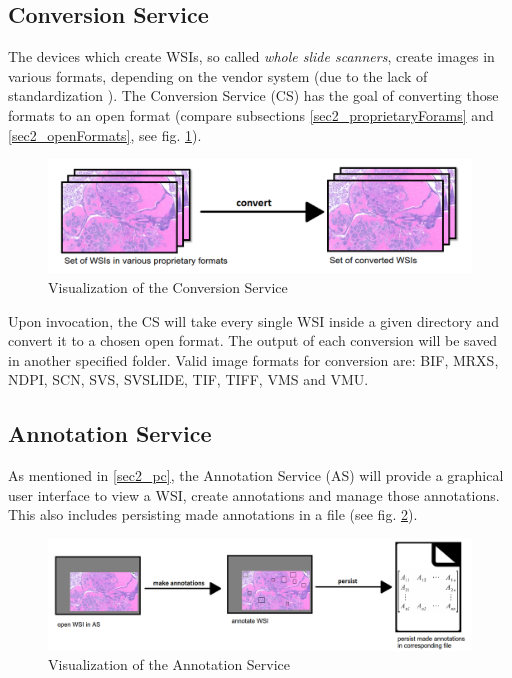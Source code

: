 \subsection{Conversion Service}
\label{sec2_cs}
The devices which create WSIs, so called \emph{whole slide scanners}, create images in various formats, depending on the vendor system (due to the lack of standardization \cite{Cornish13}). The Conversion Service (CS) has the goal of converting those formats to an open format (compare subsections \ref{sec2_proprietaryForams} and \ref{sec2_openFormats}, see fig. \ref{fig2_processChainA}).

\begin{figure}[H]
	\begin{center}
		\includegraphics[scale=0.35]{img/processChainA.png}
		\caption{Visualization of the Conversion Service}
		\label{fig2_processChainA}
	\end{center}
\end{figure}

Upon invocation, the CS will take every single WSI inside a given directory and convert it to a chosen open format. The output of each conversion will be saved in another specified folder. Valid image formats for conversion are: BIF, MRXS, NDPI, SCN, SVS, SVSLIDE, TIF, TIFF, VMS and VMU.


\subsection{Annotation Service}
\label{sec2_as}
As mentioned in \ref{sec2_pc}, the Annotation Service (AS) will provide a graphical user interface to view a WSI, create annotations and manage those annotations. This also includes persisting made annotations in a file (see fig. \ref{fig2_processChainB}).

\begin{figure}[H]
	\begin{center}
		\includegraphics[scale=0.2]{img/processChainB.png}
		\caption{Visualization of the Annotation Service}
		\label{fig2_processChainB}
	\end{center}
\end{figure}


